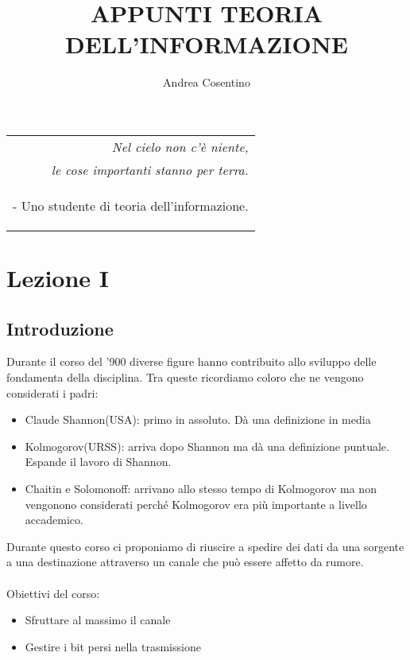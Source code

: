 \documentclass[12pt]{report}
\title{APPUNTI TEORIA DELL'INFORMAZIONE}
\author{Andrea Cosentino}
\def\blankpage{%
    \clearpage%
    \thispagestyle{empty}%
    \addtocounter{page}{-1}%
    \null%
    \clearpage}
\begin{document}
    \maketitle
    \tableofcontents

    \newpage
    \clearpage%
    \thispagestyle{empty}%
    \addtocounter{page}{-1}%
    \null%

    \begin{flushright}
        \begin{tabular}{r}
            \textit{Nel cielo non c'è niente,}
            \\
            \textit{
                le cose importanti stanno per terra.}
            \\
            \begin{footnotesize}
                - Uno studente di teoria dell'informazione.
            \end{footnotesize}
        \end{tabular}
    \end{flushright}

    \clearpage
    \pagecolor{color}
    \blankpage
    \nopagecolor
    \chapter{Lezione I}
    \label{cap:Lezione I}
    \section{Introduzione}

    Durante il corso del '900 diverse figure hanno contribuito allo sviluppo delle fondamenta della disciplina. Tra queste ricordiamo coloro che ne vengono considerati i padri:
    \begin{itemize}
        \item Claude Shannon(USA): primo in assoluto. Dà una definizione in media
        \item Kolmogorov(URSS): arriva dopo Shannon ma dà una definizione puntuale. Espande il lavoro di Shannon.
        \item Chaitin e Solomonoff: arrivano allo stesso tempo di Kolmogorov ma non vengonono considerati perché Kolmogorov era più importante a livello accademico.
    \end{itemize}
    \vspace{10px}
    Durante questo corso ci proponiamo di riuscire a spedire dei dati da una sorgente a una destinazione
    attraverso un canale che può essere affetto da rumore.
    \\ \\
    Obiettivi del corso:
    \begin{itemize}
        \item{Sfruttare al massimo il canale}
        \item{Gestire i bit persi nella trasmissione}
    \end{itemize}
    \vspace{10px}
    \newpage
\end{document}
